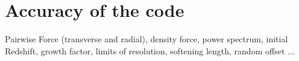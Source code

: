 \section{Accuracy of the code}

Pairwise Force (transverse and radial), density force, power spectrum, initial Redshift, 
growth factor, limits of resolution, softening length, random offset ... 
